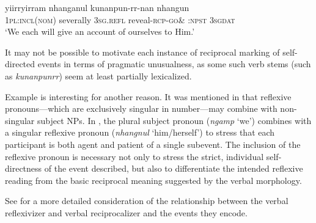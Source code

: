 \documentclass[output=paper]{langscibook}
\begin{document}
\ea 
    \label{ex:Gaby:35}
      {yiirryirram}  {nhanganul}  {kunanpun-rr-nan}  {nhangun}\\
    1\textsc{pl:incl}\textsc{(nom)}  severally  \textsc{\textsc{3sg}}.\textsc{refl}  reveal-\textsc{rcp-go\&} \textsc{:npst}  \textsc{3sg}\textsc{dat}\\
    \glt ‘We each will give an account of ourselves to Him.’ \citep[392]{Hall1972}
    \z


It may not be possible to motivate each instance of reciprocal marking of self-directed events in terms of pragmatic unusualness, as some such verb stems (such as \textit{kunanpunrr}) seem at least partially lexicalized. 

Example  is interesting for another reason. It was mentioned in  that reflexive pronouns—which are exclusively singular in number—may combine with non-singular subject NPs. In , the plural subject pronoun (\textit{ngamp} ‘we’) combines with a singular reflexive pronoun (\textit{nhangnul} ‘him/herself’) to stress that each participant is both agent and patient of a single subevent. The inclusion of the reflexive pronoun is necessary not only to stress the strict, individual self-directness of the event described, but also to differentiate the intended reflexive reading from the basic reciprocal meaning suggested by the verbal morphology.

See \citet{Gaby2008Reciprocals, Gaby2011} for a more detailed consideration of the relationship between the verbal reflexivizer and verbal reciprocalizer and the events they encode.
\end{document}
